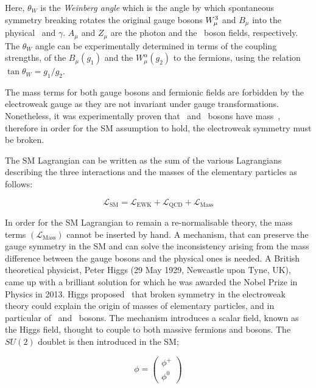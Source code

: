 			\noindent Here, $\theta_W$ is the \emph{Weinberg angle} which is the angle by which spontaneous symmetry breaking rotates the original gauge bosons $W_{\mu}^3$ and $B_{\mu}$ into the physical \Zboson\ and $\gamma$. $A_\mu$ and $Z_\mu$ are the photon and the \Zboson\ boson fields, respectively. The $\theta_W$ angle can be experimentally determined in terms of the coupling strengths, of the $B_{\mu}(g_1)$ and the $W_{\mu}^\alpha (g_2)$ to the fermions, using the relation $\tan\theta_W = g_1 / g_2 $. 

			The mass terms for both gauge bosons and fermionic fields are forbidden by the electroweak gauge as they are not invariant under gauge transformations. Nonetheless, it was experimentally proven that \Wboson\ and \Zboson\ bosons have mass~\cite{Pich2012}, therefore in order for the \ac{SM} assumption to hold, the electroweak symmetry must be broken. 

			The \ac{SM} Lagrangian can be written as the sum of the various Lagrangians describing the three interactions and the masses of the elementary particles as follows:

			\begin{equation}
			\label{eq:SM_Lagrangian}
				\mathcal{L_{\mathrm{SM}}} = \mathcal{L_{\mathrm{EWK}}} + \mathcal{L_{\mathrm{QCD}}} + \mathcal{L_{\mathrm{Mass}}}
			\end{equation}

			\noindent In order for the \ac{SM} Lagrangian to remain a re-normalisable theory, the mass terms $\left ( \mathcal{L_{\mathrm{Mass}}} \right )$ cannot be inserted by hand. A mechanism, that can preserve the gauge symmetry in the \ac{SM} and can solve the inconsistency arising from the mass difference between the gauge bosons and the physical ones is needed. A British theoretical physicist, Peter Higgs (29 May 1929, Newcastle upon Tyne, UK), came up with a brilliant solution for which he was awarded the Nobel Prize in Physics in 2013. Higgs proposed~\cite{Higgs1964} that broken symmetry in the electroweak theory could explain the origin of masses of elementary particles, and in particular of \Wboson\ and \Zboson\ bosons. The mechanism introduces a scalar field, known as the Higgs field, thought to couple to both massive fermions and bosons. The $SU(2)$ doublet is then introduced in the \ac{SM};

			\begin{equation}
			\label{eq:Higgs_field}
				\phi = 
				\begin{pmatrix}
					\phi^+ \\ \phi^0
				\end{pmatrix} 
			\end{equation}

